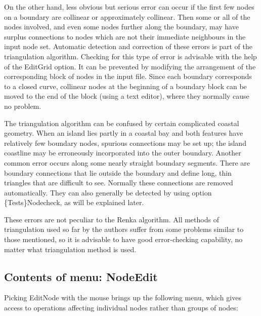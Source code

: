 \documentclass{article}
\begin{document}
On the other hand, less obvious but serious error can occur if the first few nodes on a boundary are collinear or approximately collinear. Then some or all of the nodes involved, and even some nodes further along the boundary, may have surplus connections to nodes which are not their immediate neighbours in the input node set. Automatic detection and correction of these errors is part of the triangulation algorithm. Checking for this type of error is advisable with the help of the EditGrid option. It can be prevented by modifying the arrangement of the corresponding block of nodes in the input file. Since each boundary corresponds to a closed curve, collinear nodes at the beginning of a boundary block can be moved to the end of the block (using a text editor), where they normally cause no problem.

The triangulation algorithm can be confused by certain complicated coastal geometry. When an island lies partly in a coastal bay and both features have relatively few boundary nodes, spurious connections may be set up; the island coastline may be erroneously incorporated into the outer boundary. Another common error occurs along some nearly straight boundary segments. There are boundary connections that lie outside the boundary and define long, thin triangles that are difficult to see. Normally these connections are removed automatically. They can also generally be detected by using option \{Tests\}Nodecheck, as will be explained later.

These errors are not peculiar to the Renka algorithm. All methods of triangulation used so far by the authors suffer from some problems similar to those mentioned, so it is advisable to have good error-checking capability, no matter what triangulation method is used.

\subsection{Contents of menu: NodeEdit}
Picking EditNode with the mouse brings up the following menu, which gives access to operations affecting individual nodes rather than groups of nodes:
\end{document}
